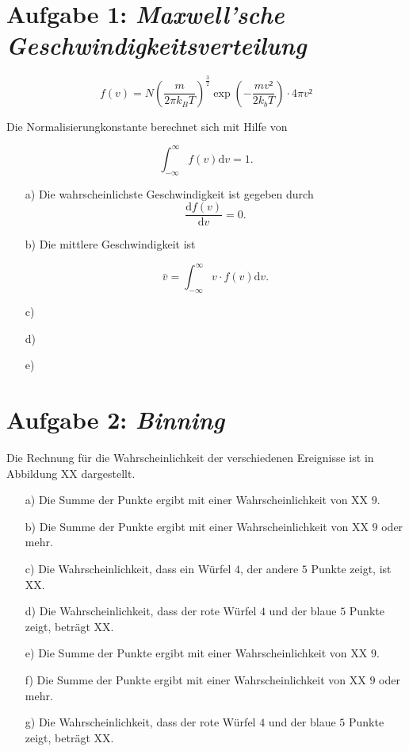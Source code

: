  
\section*{Aufgabe 1: \emph{Maxwell'sche Geschwindigkeitsverteilung}}

\begin{equation}
f(v)=N\left(\frac{m}{2\pi k_BT}\right)^\frac{3}{2}\exp{\left(-\frac{mv²}{2k_bT}\right)}\cdot4\pi v²
\end{equation}

Die Normalisierungkonstante berechnet sich mit Hilfe von

\begin{equation}
\int_{-\infty}^\infty f(v)\text{d}v=1.
\end{equation}

\begin{itemize}
\item[a)] Die wahrscheinlichste Geschwindigkeit ist gegeben durch
\begin{equation}
\frac{\text{d}f(v)}{\text{d}v}=0.
\end{equation}

\item[b)] Die mittlere Geschwindigkeit ist 

\begin{equation}
\bar{v}=\int_{-\infty}^\infty v\cdot f(v)\text{d}v.
\end{equation}



\item[c)]
\item[d)]
\item[e)]
\end{itemize}
\section*{Aufgabe 2: \emph{Binning}}

Die Rechnung für die Wahrscheinlichkeit der verschiedenen Ereignisse ist in Abbildung XX dargestellt.

\begin{itemize}
\item[a)] Die Summe der Punkte ergibt mit einer Wahrscheinlichkeit von XX $9$.

\item[b)] Die Summe der Punkte ergibt mit einer Wahrscheinlichkeit von XX $9$ oder mehr.

\item[c)] Die Wahrscheinlichkeit, dass ein Würfel $4$, der andere $5$ Punkte zeigt, ist XX.

\item[d)] Die Wahrscheinlichkeit, dass der rote Würfel $4$ und 
der blaue $5$ Punkte zeigt, beträgt XX.

\item[e)] Die Summe der Punkte ergibt mit einer Wahrscheinlichkeit von XX $9$.

\item[f)] Die Summe der Punkte ergibt mit einer 
Wahrscheinlichkeit von XX $9$ oder mehr.

\item[g)]Die Wahrscheinlichkeit, dass der rote Würfel $4$ und der blaue $5$ Punkte zeigt, beträgt XX.
\end{itemize}

